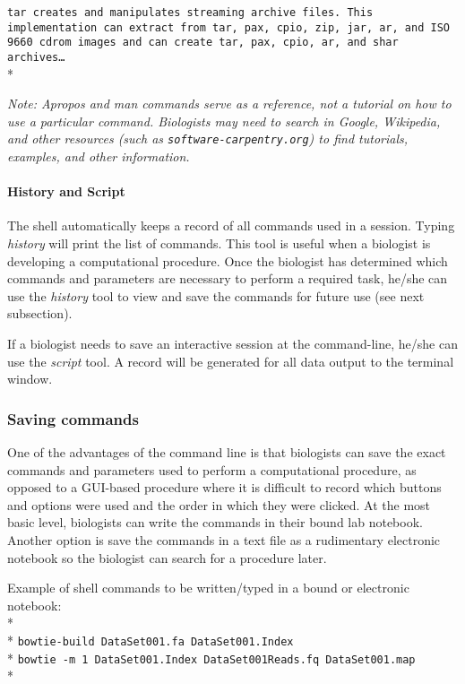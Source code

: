 \documentclass[ChapterTOCs,krantz2]{krantz} %
\begin{document}
\texttt{tar creates and manipulates streaming archive files.  This
implementation can extract from tar, pax, cpio, zip, jar, ar, and ISO 9660
cdrom images and can create tar, pax, cpio, ar, and shar archives\ldots}\\*

\noindent
\textsl{Note: Apropos and man commands serve as a reference, not a tutorial on how to use
a particular command. Biologists may need to search in Google,
Wikipedia, and other resources (such as \texttt{software-carpentry.org}) 
to find tutorials, examples, and other information.}

\paragraph{History and Script}

The shell automatically keeps a record of all commands used 
in a session.  Typing \emph{history} will print the list of commands.  
This tool is useful when a biologist is developing a computational procedure.  
Once the biologist has determined which commands and parameters 
are necessary to perform a required 
task, he/she can use the \emph{history} tool to view and save the commands for 
future use (see next subsection).

If a biologist needs to save an interactive session at the command-line, 
he/she can use the \emph{script} tool.  A record will be generated 
for all data output to the terminal window.

\subsubsection{Saving commands}

One of the advantages of the command line is
that biologists can save the exact commands and parameters used to perform a
computational procedure, as opposed to a GUI-based procedure where it is
difficult to record which buttons and options were used and the order in which
they were clicked.  At the most basic level, biologists can write the commands
in their bound lab notebook.  Another option is save the commands in a text
file as a rudimentary electronic notebook so the biologist can search for a
procedure later.   

Example of shell commands to be written/typed in a bound or electronic notebook:\\* \\*
\texttt{bowtie-build DataSet001.fa DataSet001.Index}\\*
\texttt{bowtie -m 1 DataSet001.Index DataSet001Reads.fq DataSet001.map }\\*
\end{document}
